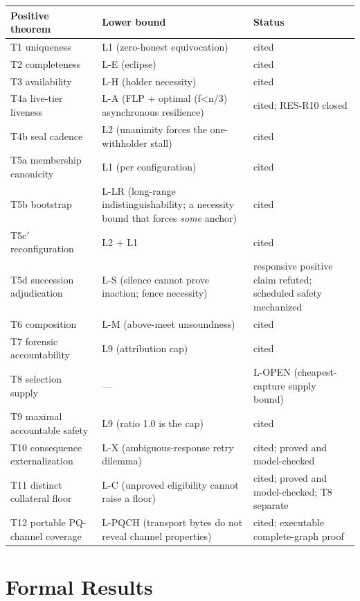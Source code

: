 \documentclass[11pt]{article}
\begin{document}
\begin{center}
\small
\begin{tabularx}{\textwidth}{>{\raggedright\arraybackslash}p{} >{\raggedright\arraybackslash}p{} X}
\toprule
\textbf{Positive theorem} & \textbf{Lower bound} & \textbf{Status} \\
\midrule
T1 uniqueness & L1 (zero-honest equivocation) & cited \\
T2 completeness & L-E (eclipse) & cited \\
T3 availability & L-H (holder necessity) & cited \\
T4a live-tier liveness & L-A (FLP + optimal (f<n/3) asynchronous resilience) & cited; RES-R10 closed \\
T4b seal cadence & L2 (unanimity forces the one-withholder stall) & cited \\
T5a membership canonicity & L1 (per configuration) & cited \\
T5b bootstrap & L-LR (long-range indistinguishability; a necessity bound that forces \emph{some} anchor) & cited \\
T5c\('\) reconfiguration & L2 + L1 & cited \\
T5d succession adjudication & L-S (silence cannot prove inaction; fence necessity) & responsive positive claim refuted; scheduled safety mechanized \\
T6 composition & L-M (above-meet unsoundness) & cited \\
T7 forensic accountability & L9 (attribution cap) & cited \\
T8 selection supply & --- & L-OPEN (cheapest-capture supply bound) \\
T9 maximal accountable safety & L9 (ratio 1.0 is the cap) & cited \\
T10 consequence externalization & L-X (ambiguous-response retry dilemma) & cited; proved and model-checked \\
T11 distinct collateral floor & L-C (unproved eligibility cannot raise a floor) & cited; proved and model-checked; T8 separate \\
T12 portable PQ-channel coverage & L-PQCH (transport bytes do not reveal channel properties) & cited; executable complete-graph proof \\
\bottomrule
\end{tabularx}
\end{center}

\section{Formal Results}
\end{document}
